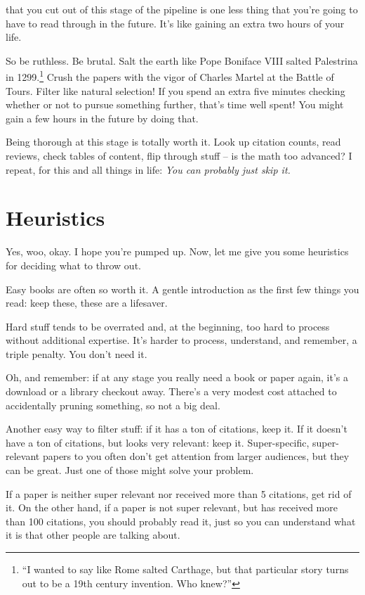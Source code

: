  that you cut out of this stage of the
pipeline is one less thing that you're going to have to read through in the
future. It's like gaining an extra two hours of your life.

So be ruthless. Be brutal. Salt the earth like Pope Boniface VIII salted Palestrina in 1299.\footnote{``I wanted to say like Rome salted Carthage, but that particular story turns out to be a 19th century invention. Who knew?''} Crush the papers with the vigor of Charles Martel at the Battle of Tours. Filter like natural selection! If
you spend an extra five minutes checking whether or not to pursue something
further, that's time well spent! You might gain a few hours in the future by
doing that.

Being thorough at this stage is totally worth it. Look up citation counts, read
reviews, check tables of content, flip through stuff -- is the math too advanced?
I repeat, for this and all things in life: \textit{You can probably just skip
  it.}

\section{Heuristics}

Yes, woo, okay. I hope you're pumped up. Now, let me give you some heuristics
for deciding what to throw out.

Easy books are often so worth it. A gentle introduction as the first few things
you read: keep these, these are a lifesaver.

Hard stuff tends to be overrated and, at the beginning, too hard to process
without additional expertise. It's harder to process, understand, and
remember, a triple penalty. You don't need it.

Oh, and remember: if at any stage you really need a book or paper again, it's a
download or a library checkout away. There's a very modest cost attached to
accidentally pruning something, so not a big deal.

Another easy way to filter stuff: if it has a ton of citations, keep it. If it
doesn't have a ton of citations, but looks very relevant: keep
it. Super-specific, super-relevant papers to you often don't get attention from
larger audiences, but they can be great. Just one of those might solve
your problem.

If a paper is neither super relevant nor received more than 5 citations, get rid
of it. On the other hand, if a paper is not super relevant, but has received
more than 100 citations, you should probably read it, just so you can understand
what it is that other people are talking about. 

